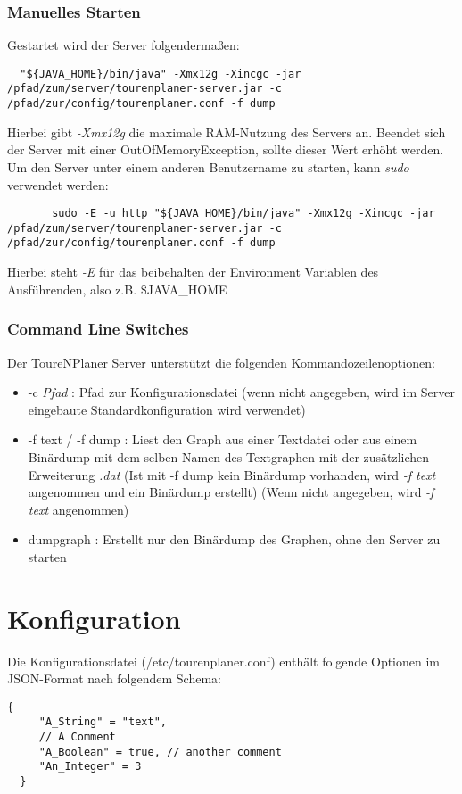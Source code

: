 \documentclass[ngerman,titlepage,parskip=true]{scrartcl}
\begin{document}
	\subsubsection{Manuelles Starten}
  Gestartet wird der Server folgenderma\ss{}en:
	\begin{lstlisting}
  "${JAVA_HOME}/bin/java" -Xmx12g -Xincgc -jar /pfad/zum/server/tourenplaner-server.jar -c /pfad/zur/config/tourenplaner.conf -f dump
	\end{lstlisting}
	Hierbei gibt \textit{-Xmx12g} die maximale RAM-Nutzung des Servers an. Beendet sich der Server mit einer OutOfMemoryException, sollte dieser Wert erh\"oht werden.
	Um den Server unter einem anderen Benutzername zu starten, kann \textit{sudo} verwendet werden:
	\begin{lstlisting}
	   sudo -E -u http "${JAVA_HOME}/bin/java" -Xmx12g -Xincgc -jar /pfad/zum/server/tourenplaner-server.jar -c /pfad/zur/config/tourenplaner.conf -f dump
	\end{lstlisting}
  Hierbei steht \textit{-E} f\"ur das beibehalten der Environment Variablen des Ausf\"uhrenden, also z.B. \$JAVA\_HOME


	\subsubsection{Command Line Switches}
	Der ToureNPlaner Server unterst\"utzt die folgenden Kommandozeilenoptionen:
	\begin{itemize}
	  \item -c \textit{Pfad} : Pfad zur Konfigurationsdatei (wenn nicht angegeben, wird im Server eingebaute Standardkonfiguration wird verwendet)
	  \item -f text / -f dump : Liest den Graph aus einer Textdatei oder aus einem Bin\"ardump mit dem selben Namen des Textgraphen mit der zus\"atzlichen Erweiterung \textit{.dat} (Ist mit -f dump kein Bin\"ardump vorhanden, wird \textit{-f text} angenommen und ein Bin\"ardump erstellt) (Wenn nicht angegeben, wird \textit{-f text} angenommen)
	 \item dumpgraph : Erstellt nur den Bin\"ardump des Graphen, ohne den Server zu starten
	\end{itemize}

\section{Konfiguration}
Die Konfigurationsdatei (/etc/tourenplaner.conf) enth\"alt folgende Optionen im JSON-Format nach folgendem Schema:
\begin{lstlisting}[caption=Konfigurations-Schema,float]
  {
	 "A_String" = "text",
	 // A Comment
	 "A_Boolean" = true, // another comment
	 "An_Integer" = 3
  }
\end{lstlisting}
\end{document}
